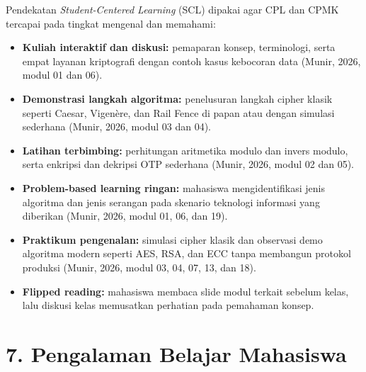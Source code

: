 \documentclass[12pt,a4paper]{article}
\begin{document}
Pendekatan \textit{Student-Centered Learning} (SCL) dipakai agar CPL dan CPMK tercapai pada tingkat mengenal dan memahami:
\begin{itemize}[leftmargin=*]
  \item \textbf{Kuliah interaktif dan diskusi:} pemaparan konsep, terminologi, serta empat layanan kriptografi dengan contoh kasus kebocoran data (Munir, 2026, modul 01 dan 06).
  \item \textbf{Demonstrasi langkah algoritma:} penelusuran langkah cipher klasik seperti Caesar, Vigen\`{e}re, dan Rail Fence di papan atau dengan simulasi sederhana (Munir, 2026, modul 03 dan 04).
  \item \textbf{Latihan terbimbing:} perhitungan aritmetika modulo dan invers modulo, serta enkripsi dan dekripsi OTP sederhana (Munir, 2026, modul 02 dan 05).
  \item \textbf{Problem-based learning ringan:} mahasiswa mengidentifikasi jenis algoritma dan jenis serangan pada skenario teknologi informasi yang diberikan (Munir, 2026, modul 01, 06, dan 19).
  \item \textbf{Praktikum pengenalan:} simulasi cipher klasik dan observasi demo algoritma modern seperti AES, RSA, dan ECC tanpa membangun protokol produksi (Munir, 2026, modul 03, 04, 07, 13, dan 18).
  \item \textbf{Flipped reading:} mahasiswa membaca slide modul terkait sebelum kelas, lalu diskusi kelas memusatkan perhatian pada pemahaman konsep.
\end{itemize}

\vspace{0.5cm}

\section*{7. Pengalaman Belajar Mahasiswa}
\end{document}
